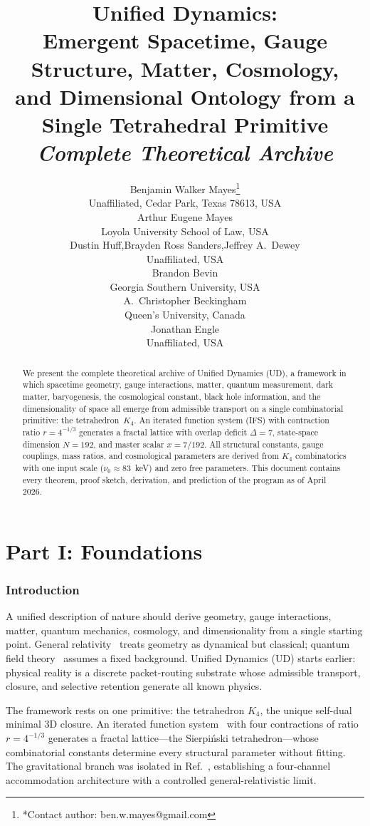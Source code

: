 \documentclass[11pt,twocolumn]{article}
\title{Unified Dynamics:\\Emergent Spacetime, Gauge Structure, Matter, Cosmology,\\and Dimensional Ontology from a Single Tetrahedral Primitive\\[8pt]\large\textit{Complete Theoretical Archive}}
\author{%
Benjamin Walker Mayes\thanks{*Contact author: ben.w.mayes@gmail.com}\\[4pt]
{\small Unaffiliated, Cedar Park, Texas 78613, USA}\\[8pt]
Arthur Eugene Mayes\\
{\small Loyola University School of Law, USA}\\[4pt]
Dustin Huff,\quad Brayden Ross Sanders,\quad Jeffrey A.\ Dewey\\
{\small Unaffiliated, USA}\\[4pt]
Brandon Bevin\\
{\small Georgia Southern University, USA}\\[4pt]
A.\ Christopher Beckingham\\
{\small Queen's University, Canada}\\[4pt]
Jonathan Engle\\
{\small Unaffiliated, USA}%
}
\date{}
\begin{document}
\maketitle

\begin{abstract}
We present the complete theoretical archive of Unified Dynamics (UD), a framework in which spacetime geometry, gauge interactions, matter, quantum measurement, dark matter, baryogenesis, the cosmological constant, black hole information, and the dimensionality of space all emerge from admissible transport on a single combinatorial primitive: the tetrahedron~$K_4$.
An iterated function system (IFS) with contraction ratio $r=4^{-1/3}$ generates a fractal lattice with overlap deficit $\Delta=7$, state-space dimension $N=192$, and master scalar $x=7/192$.
All structural constants, gauge couplings, mass ratios, and cosmological parameters are derived from $K_4$ combinatorics with one input scale ($\nu_0\approx 83$~keV) and zero free parameters.
This document contains every theorem, proof sketch, derivation, and prediction of the program as of April 2026.
\end{abstract}

\tableofcontents


\part*{Part I: Foundations}

\section{Introduction}
\label{sec:intro}

A unified description of nature should derive geometry, gauge interactions, matter, quantum mechanics, cosmology, and dimensionality from a single starting point.
General relativity~\cite{einstein1915} treats geometry as dynamical but classical; quantum field theory~\cite{yangmills1954} assumes a fixed background.
Unified Dynamics (UD) starts earlier: physical reality is a discrete packet-routing substrate whose admissible transport, closure, and selective retention generate all known physics.

The framework rests on one primitive: the tetrahedron $K_4$, the unique self-dual minimal 3D closure.
An iterated function system~\cite{hutchinson1981,falconer2003} with four contractions of ratio $r=4^{-1/3}$ generates a fractal lattice---the Sierpi\'nski tetrahedron---whose combinatorial constants determine every structural parameter without fitting.
The gravitational branch was isolated in Ref.~\cite{mayes2026grav}, establishing a four-channel accommodation architecture with a controlled general-relativistic limit.
\end{document}
